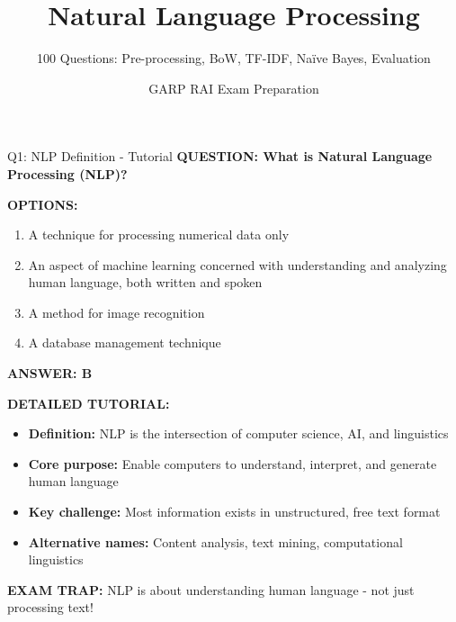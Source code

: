 \documentclass[8pt]{beamer}
\title{Natural Language Processing}
\subtitle{100 Questions: Pre-processing, BoW, TF-IDF, Naïve Bayes, Evaluation}
\author{GARP RAI Exam Preparation}
\date{}
\begin{document}
	
	\begin{frame}
		\titlepage
	\end{frame}
	
	
	\begin{frame}{Q1: NLP Definition - Tutorial}
		\fontsize{6.5}{7.5}\selectfont
		\textbf{QUESTION: What is Natural Language Processing (NLP)?}
		
		\vspace{0.1cm}
		\textbf{OPTIONS:}
		\begin{enumerate}
			\item A technique for processing numerical data only
			\item An aspect of machine learning concerned with understanding and analyzing human language, both written and spoken
			\item A method for image recognition
			\item A database management technique
		\end{enumerate}
		
		\vspace{0.1cm}
		\textcolor{myblue}{\textbf{ANSWER: B}}
		
		\vspace{0.1cm}
		\textbf{DETAILED TUTORIAL:}
		\begin{itemize}
			\item \textbf{Definition:} NLP is the intersection of computer science, AI, and linguistics
			\item \textbf{Core purpose:} Enable computers to understand, interpret, and generate human language
			\item \textbf{Key challenge:} Most information exists in unstructured, free text format
			\item \textbf{Alternative names:} Content analysis, text mining, computational linguistics
		\end{itemize}
		
		\textcolor{myred}{\textbf{EXAM TRAP:}} NLP is about \textcolor{myblue}{understanding human language} - not just processing text!
	\end{frame}
	
\end{document}
